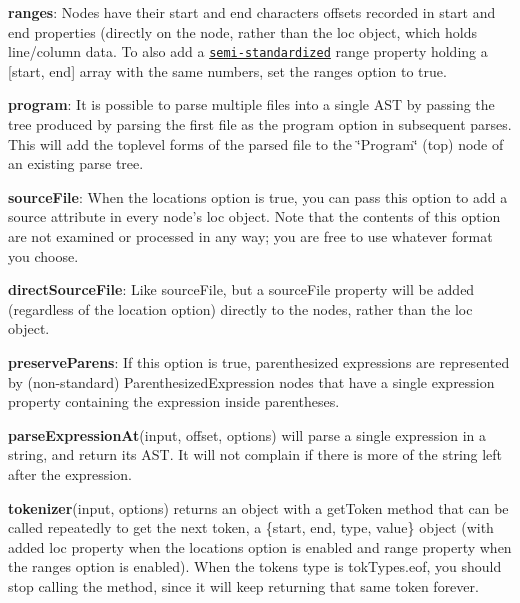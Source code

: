\begin{DoxyItemize}
\item {\bfseries ranges}\+: Nodes have their start and end characters offsets recorded in {\ttfamily start} and {\ttfamily end} properties (directly on the node, rather than the {\ttfamily loc} object, which holds line/column data. To also add a \href{https://bugzilla.mozilla.org/show_bug.cgi?id=745678}{\tt semi-\/standardized} {\ttfamily range} property holding a {\ttfamily \mbox{[}start, end\mbox{]}} array with the same numbers, set the {\ttfamily ranges} option to {\ttfamily true}.
\item {\bfseries program}\+: It is possible to parse multiple files into a single A\+ST by passing the tree produced by parsing the first file as the {\ttfamily program} option in subsequent parses. This will add the toplevel forms of the parsed file to the \char`\"{}\+Program\char`\"{} (top) node of an existing parse tree.
\item {\bfseries source\+File}\+: When the {\ttfamily locations} option is {\ttfamily true}, you can pass this option to add a {\ttfamily source} attribute in every node’s {\ttfamily loc} object. Note that the contents of this option are not examined or processed in any way; you are free to use whatever format you choose.
\item {\bfseries direct\+Source\+File}\+: Like {\ttfamily source\+File}, but a {\ttfamily source\+File} property will be added (regardless of the {\ttfamily location} option) directly to the nodes, rather than the {\ttfamily loc} object.
\item {\bfseries preserve\+Parens}\+: If this option is {\ttfamily true}, parenthesized expressions are represented by (non-\/standard) {\ttfamily Parenthesized\+Expression} nodes that have a single {\ttfamily expression} property containing the expression inside parentheses.
\end{DoxyItemize}

{\bfseries parse\+Expression\+At}{\ttfamily (input, offset, options)} will parse a single expression in a string, and return its A\+ST. It will not complain if there is more of the string left after the expression.

{\bfseries tokenizer}{\ttfamily (input, options)} returns an object with a {\ttfamily get\+Token} method that can be called repeatedly to get the next token, a {\ttfamily \{start, end, type, value\}} object (with added {\ttfamily loc} property when the {\ttfamily locations} option is enabled and {\ttfamily range} property when the {\ttfamily ranges} option is enabled). When the token\textquotesingle{}s type is {\ttfamily tok\+Types.\+eof}, you should stop calling the method, since it will keep returning that same token forever.

